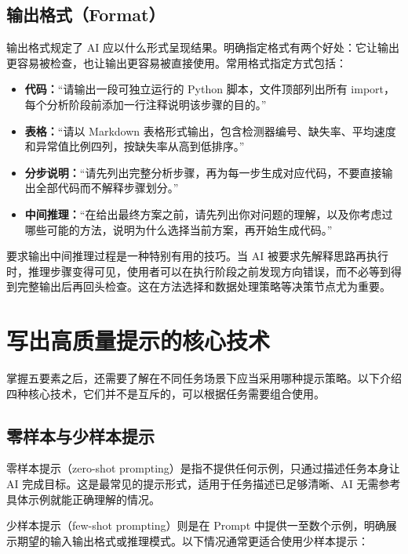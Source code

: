 \subsection{输出格式（Format）}

输出格式规定了 AI 应以什么形式呈现结果。明确指定格式有两个好处：它让输出更容易被检查，也让输出更容易被直接使用。常用格式指定方式包括：

\begin{itemize}
  \item \textbf{代码：}“请输出一段可独立运行的 Python 脚本，文件顶部列出所有 import，每个分析阶段前添加一行注释说明该步骤的目的。”
  \item \textbf{表格：}“请以 Markdown 表格形式输出，包含检测器编号、缺失率、平均速度和异常值比例四列，按缺失率从高到低排序。”
  \item \textbf{分步说明：}“请先列出完整分析步骤，再为每一步生成对应代码，不要直接输出全部代码而不解释步骤划分。”
  \item \textbf{中间推理：}“在给出最终方案之前，请先列出你对问题的理解，以及你考虑过哪些可能的方法，说明为什么选择当前方案，再开始生成代码。”
\end{itemize}

要求输出中间推理过程是一种特别有用的技巧。当 AI 被要求先解释思路再执行时，推理步骤变得可见，使用者可以在执行阶段之前发现方向错误，而不必等到得到完整输出后再回头检查。这在方法选择和数据处理策略等决策节点尤为重要。

\section{写出高质量提示的核心技术}

掌握五要素之后，还需要了解在不同任务场景下应当采用哪种提示策略。以下介绍四种核心技术，它们并不是互斥的，可以根据任务需要组合使用。

\subsection{零样本与少样本提示}

零样本提示（zero-shot prompting）是指不提供任何示例，只通过描述任务本身让 AI 完成目标。这是最常见的提示形式，适用于任务描述已足够清晰、AI 无需参考具体示例就能正确理解的情况。

少样本提示（few-shot prompting）则是在 Prompt 中提供一至数个示例，明确展示期望的输入输出格式或推理模式。以下情况通常更适合使用少样本提示：

